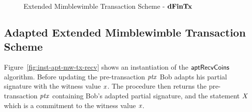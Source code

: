 \begin{figure}
    \caption{Extended Mimblewimble Transaction Scheme - $\mathbf{dFinTx}$ \label{fig:ext-mim-tx-fin}}
\end{figure}

\subsection{Adapted Extended Mimblewimble Transaction Scheme}

Figure~\cref{fig:inst-apt-mw-tx-recv} shows an instantiation of the $\mathsf{aptRecvCoins}$ algorithm.
Before updating the pre-transaction $\mathit{ptx}$ Bob adapts his partial signature with the witness value $\mathit{x}$.
The procedure then returns the pre-transaction $\mathit{ptx}$ containing Bob's adapted partial signature, and the statement $\mathit{X}$ which is a commitment to the witness value $\mathit{x}$.

